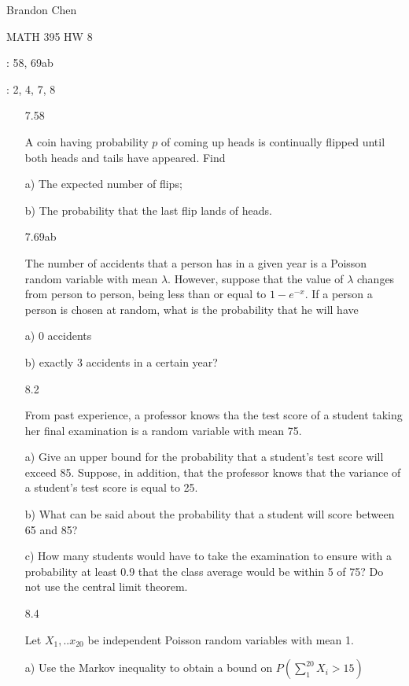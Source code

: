 \documentclass[11pt]{article}
\begin{document}
\noindent Brandon Chen

\noindent MATH 395 HW 8

: 58, 69ab

: 2, 4, 7, 8

\begin{itemize}

	\item[7.58]

		A coin having probability $p$ of coming up heads is
		continually flipped until both heads and tails have 
		appeared. Find

		a) The expected number of flips;

		b) The probability that the last flip lands of heads.

	\item[7.69ab]

		The number of accidents that a person has in a given year 
		is a Poisson random variable with mean $\lambda$. 
		However, suppose that the value of $\lambda$ changes 
		from person to person, being less than or equal to 
		$1 - e^{-x}$. If a person a person is chosen at random,
		what is the probability that he will have

		a) 0 accidents

		b) exactly 3 accidents in a certain year?

	\item[8.2]

		From past experience, a professor knows tha the test 
		score of a student taking her final examination is a 
		random variable with mean 75.

		a) Give an upper bound for the probability that a 
		student's test score will exceed 85. Suppose, 
		in addition, that the professor knows that the 
		variance of a student's test score is equal to 25.



		b) What can be said about the probability that
		a student will score between 65 and 85?

		c) How many students would have to take the 
		examination to ensure with a probability at least 0.9 
		that the class average would be within 5 of 75? 
		Do not use the central limit theorem.

	\item[8.4]
		
		Let $X_1, ..x_{20}$ be independent Poisson random 
		variables with mean 1.

		a) Use the Markov inequality to obtain a bound on
		$P(\sum_{1}^{20} X_i > 15)$


\end{itemize}
\end{document}
